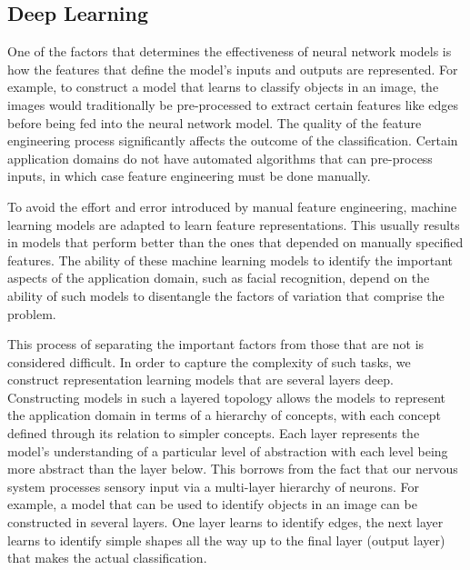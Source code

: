\subsection{Deep Learning} \label{sec:background-deep-learning}

One of the factors that determines the effectiveness of neural network models is how the features that define the model's inputs and outputs are represented. For example, to construct a model that learns to classify objects in an image, the images would traditionally be pre-processed to extract certain features like edges before being fed into the neural network model. The quality of the feature engineering process significantly affects the outcome of the classification. Certain application domains do not have automated algorithms that can pre-process inputs, in which case feature engineering must be done manually\cite{Goodfellow-et-al-2016}.

To avoid the effort and error introduced by manual feature engineering, machine learning models are adapted to learn feature representations. This usually results in models that perform better than the ones that depended on manually specified features. The ability of these machine learning models to identify the important aspects of the application domain, such as facial recognition, depend on the ability of such models to disentangle the factors of variation that comprise the problem\cite{Bengio:2009:LDA:1658423.1658424}.

This process of separating the important factors from those that are not is considered difficult. In order to capture the complexity of such tasks, we construct representation learning models that are several layers deep. Constructing models in such a layered topology allows the models to represent the application domain in terms of a hierarchy of concepts, with each concept defined through its relation to simpler concepts\cite{Goodfellow-et-al-2016}. Each layer represents the model's understanding of a particular level of abstraction with each level being more abstract than the layer below\cite{Bengio:2009:LDA:1658423.1658424}. This borrows from the fact that our nervous system processes sensory input via a multi-layer hierarchy of neurons\cite{DBLP:journals/corr/abs-1203-2990}. For example, a model that can be used to identify objects in an image can be constructed in several layers. One layer learns to identify edges, the next layer learns to identify simple shapes all the way up to the final layer (output layer) that makes the actual classification.

